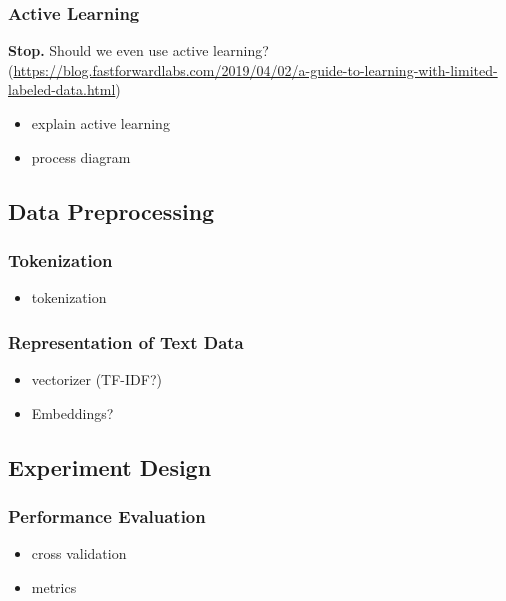\subsubsection{Active Learning}
\textbf{Stop.} Should we even use active learning? (\url{https://blog.fastforwardlabs.com/2019/04/02/a-guide-to-learning-with-limited-labeled-data.html})
\begin{itemize}[noitemsep]
	\item explain active learning
	\item process diagram
\end{itemize}




\subsection{Data Preprocessing}

\subsubsection{Tokenization}
\begin{itemize}[noitemsep]
	\item tokenization
\end{itemize}

\subsubsection{Representation of Text Data}
\begin{itemize}[noitemsep]
	\item vectorizer (TF-IDF?)
	\item Embeddings?
\end{itemize}






\subsection{Experiment Design}

\subsubsection{Performance Evaluation}
\begin{itemize}[noitemsep]
	\item cross validation
	\item metrics
\end{itemize}



